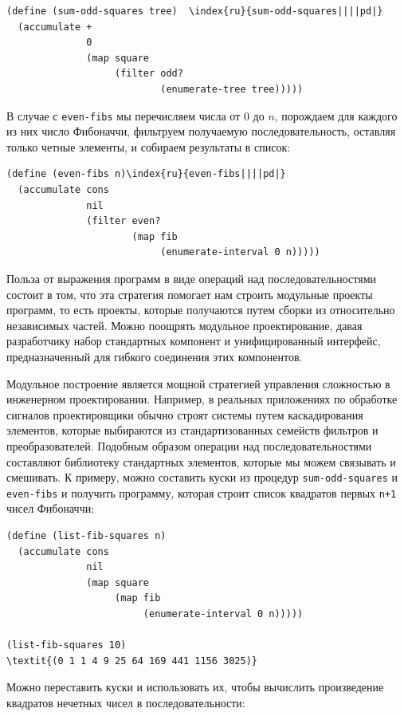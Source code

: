 \begin{Verbatim}[fontsize=\small]
(define (sum-odd-squares tree)  \index{ru}{sum-odd-squares||||pd|}
  (accumulate +
              0
              (map square
                   (filter odd?
                           (enumerate-tree tree)))))
\end{Verbatim}
В случае с {\tt even-fibs} мы перечисляем числа от 0 до
$n$, порождаем для каждого из них число Фибоначчи,
фильтруем получаемую последовательность, оставляя только четные
элементы, и собираем результаты в список:

\begin{Verbatim}[fontsize=\small]
(define (even-fibs n)\index{ru}{even-fibs||||pd|}
  (accumulate cons
              nil
              (filter even?
                      (map fib
                           (enumerate-interval 0 n)))))
\end{Verbatim}

Польза от выражения программ в виде операций 
над последовательностями состоит в том, что эта стратегия помогает нам строить
модульные проекты программ, то есть проекты, которые получаются путем
сборки из относительно независимых частей.  Можно поощрять модульное
проектирование, давая разработчику набор стандартных компонент и
унифицированный интерфейс, предназначенный для гибкого соединения
этих компонентов.

 Модульное построение является мощной стратегией
управления сложностью в инженерном проектировании.  Например, в реальных
приложениях по обработке сигналов проектировщики обычно
строят системы путем каскадирования элементов, которые
выбираются из стандартизованных семейств фильтров и преобразователей.
Подобным образом операции над последовательностями составляют библиотеку 
стандартных элементов, которые мы можем связывать и смешивать.  К
примеру, можно составить куски из процедур
{\tt sum-odd-squares} и {\tt even-fibs} и получить
программу, которая строит список квадратов первых {\tt n+1}
чисел Фибоначчи:

\begin{Verbatim}[fontsize=\small]
(define (list-fib-squares n)
  (accumulate cons
              nil
              (map square
                   (map fib
                        (enumerate-interval 0 n)))))

(list-fib-squares 10)
\textit{(0 1 1 4 9 25 64 169 441 1156 3025)}
\end{Verbatim}
Можно переставить куски и использовать их, чтобы вычислить
произведение квадратов нечетных чисел в последовательности:

